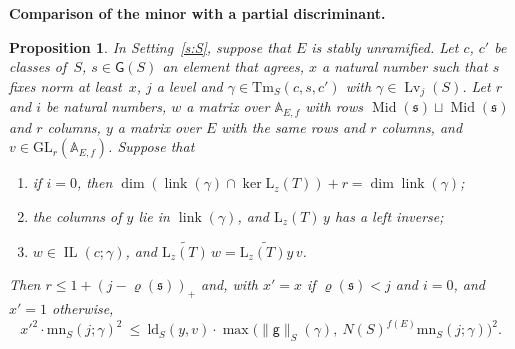\documentclass[11pt,a4paper]{article}
\newcommand{\m}[1]{\mbox{$#1$}}        %
\newcommand{\subhead}[1]{\par\addvspace{9pt plus 2pt}\Needspace{4\baselineskip}\noindent\textbf{#1}\enspace\ignorespaces}
\theoremstyle{plainx}
\newtheorem{proposition}[theorem]{Proposition}
\theoremstyle{uprightx}
\newcommand{\fs}{\mathfrak{s}}                      %
\newcommand{\AEf}{\mathbb{A}_{E,f}}
\newcommand{\GL}{\mathrm{GL}}
\newcommand{\rh}[1]{\varrho(#1)}                    %
\newcommand{\Mx}[1]{\operatorname{Mid}(#1)}                          %
\newcommand{\ninf}[1]{f(#1)}                        %
\newcommand{\NS}[1]{N(#1)}                          %
\newcommand{\GRes}[1]{\mathsf{G}(#1)}               %
\newcommand{\terms}[4]{\mathrm{Tm}_{#1}(#2,#3,#4)}  %
\newcommand{\link}[1]{\operatorname{link}(#1)}      %
\newcommand{\tdnorm}[2]{\|\mathsf{g}\|_{#1}(#2)}    %
\newcommand{\mnorm}[3]{\mathrm{mn}_{#1}(#2;#3)}     %
\newcommand{\ldsq}[3]{\mathrm{ld}_{#1}(#2,#3)}      %
\newcommand{\zp}[1]{\mathrm{L}_{z}(#1)}               %
\newcommand{\lifts}[4]{#4\in\operatorname{IL}(#2;#3)} %
\newcommand{\haslevel}[3]{#3\in\operatorname{Lv}_{#2}(#1)} %
\begin{document}
\subhead{Comparison of the minor with a partial discriminant.}
\begin{proposition}\label{p:minor}
In Setting~\ref{s:S}, suppose that $E$ is stably unramified. Let $c$, $c'$ be classes of~$S$, \m{s\in\GRes{S}} an
element that agrees, $x$ a natural number such that $s$ fixes norm at least~$x$, $j$ a level and
\m{\gamma\in\terms{S}{c}{s}{c'}} with \m{\haslevel{S}{j}{\gamma}}. Let $r$ and $i$ be natural numbers, $w$ a
matrix over \m{\AEf} with rows \m{\Mx{\fs}\sqcup\Mx{\fs}} and $r$ columns, $y$ a matrix over $E$ with the same
rows and $r$ columns, and \m{v\in\GL_r(\AEf)}. Suppose that
\begin{enumerate}[label=\textup{(\alph*)},leftmargin=2.3em,itemsep=1pt]
\item if \m{i=0}, then \m{\dim(\link{\gamma}\cap\ker\zp{T})+r=\dim\link{\gamma}};
\item the columns of $y$ lie in \m{\link{\gamma}}, and \m{\zp{T}\,y} has a left inverse;
\item \m{\lifts{S}{c}{\gamma}{w}}, and \m{\widetilde{\zp{T}}\,w=\widetilde{\zp{T}y}\,v}.
\end{enumerate}
Then \m{r\le1+(j-\rh{\fs})_+} and, with \m{x'=x} if \m{\rh{\fs}<j} and \m{i=0}, and \m{x'=1} otherwise,
\[x'^2\cdot\mnorm{S}{j}{\gamma}^2\ \le\ \ldsq{S}{y}{v}\cdot\max\bigl(\tdnorm{S}{\gamma},\ \NS{S}^{\ninf{E}}\mnorm{S}{j}{\gamma}\bigr)^2 .\]
\end{proposition}
\end{document}
